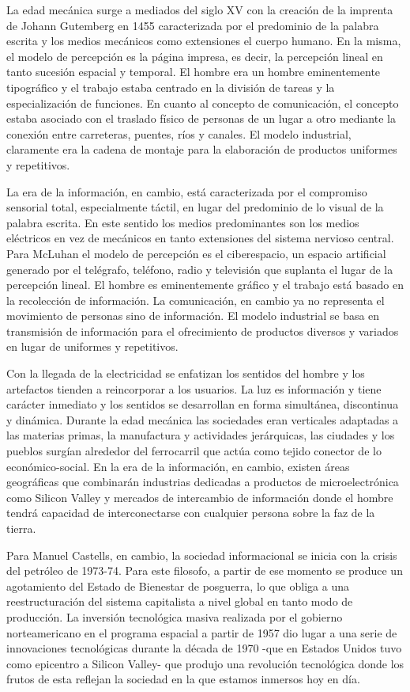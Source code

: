 \documentclass[
  letterpaper,
  DIV=11,
  numbers=noendperiod]{scrreprt}
\begin{document}
La edad mecánica surge a mediados del siglo XV con la creación de la
imprenta de Johann Gutemberg en 1455 caracterizada por el predominio de
la palabra escrita y los medios mecánicos como extensiones el cuerpo
humano. En la misma, el modelo de percepción es la página impresa, es
decir, la percepción lineal en tanto sucesión espacial y temporal. El
hombre era un hombre eminentemente tipográfico y el trabajo estaba
centrado en la división de tareas y la especialización de funciones. En
cuanto al concepto de comunicación, el concepto estaba asociado con el
traslado físico de personas de un lugar a otro mediante la conexión
entre carreteras, puentes, ríos y canales. El modelo industrial,
claramente era la cadena de montaje para la elaboración de productos
uniformes y repetitivos.

La era de la información, en cambio, está caracterizada por el
compromiso sensorial total, especialmente táctil, en lugar del
predominio de lo visual de la palabra escrita. En este sentido los
medios predominantes son los medios eléctricos en vez de mecánicos en
tanto extensiones del sistema nervioso central. Para McLuhan el modelo
de percepción es el ciberespacio, un espacio artificial generado por el
telégrafo, teléfono, radio y televisión que suplanta el lugar de la
percepción lineal. El hombre es eminentemente gráfico y el trabajo está
basado en la recolección de información. La comunicación, en cambio ya
no representa el movimiento de personas sino de información. El modelo
industrial se basa en transmisión de información para el ofrecimiento de
productos diversos y variados en lugar de uniformes y repetitivos.

Con la llegada de la electricidad se enfatizan los sentidos del hombre y
los artefactos tienden a reincorporar a los usuarios. La luz es
información y tiene carácter inmediato y los sentidos se desarrollan en
forma simultánea, discontinua y dinámica. Durante la edad mecánica las
sociedades eran verticales adaptadas a las materias primas, la
manufactura y actividades jerárquicas, las ciudades y los pueblos
surgían alrededor del ferrocarril que actúa como tejido conector de lo
económico-social. En la era de la información, en cambio, existen áreas
geográficas que combinarán industrias dedicadas a productos de
microelectrónica como Silicon Valley y mercados de intercambio de
información donde el hombre tendrá capacidad de interconectarse con
cualquier persona sobre la faz de la tierra.

Para Manuel Castells, en cambio, la sociedad informacional se inicia con
la crisis del petróleo de 1973-74. Para este filosofo, a partir de ese
momento se produce un agotamiento del Estado de Bienestar de posguerra,
lo que obliga a una reestructuración del sistema capitalista a nivel
global en tanto modo de producción. La inversión tecnológica masiva
realizada por el gobierno norteamericano en el programa espacial a
partir de 1957 dio lugar a una serie de innovaciones tecnológicas
durante la década de 1970 -que en Estados Unidos tuvo como epicentro a
Silicon Valley- que produjo una revolución tecnológica donde los frutos
de esta reflejan la sociedad en la que estamos inmersos hoy en día.
\end{document}
